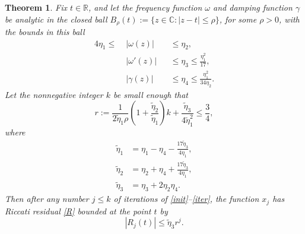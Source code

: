 \documentclass[10pt]{article}
\newcommand{\be}{\begin{equation}}
\newcommand{\ee}{\end{equation}}
\newcommand{\C}{\mathbb{C}}
\newcommand{\R}{\mathbb{R}}
\newcommand{\bigO}{{\mathcal O}}
\newtheorem{thm}{Theorem}
\newcommand{\om}{\omega}
\newcommand{\g}{\gamma}
\newcommand{\te}{\tilde\eta}
\begin{document}


\begin{thm}\label{TR}   
  Fix $t\in\R$, and let the frequency function $\om$ and damping function $\g$ be analytic
  in the closed ball $B_\rho(t) := \{z\in\C : |z-t| \le \rho\}$,
  for some $\rho>0$, with the bounds in this ball
    \begin{alignat}{4}
        \eta_1 \leq \; &|\om(z)| && \leq \eta_2,          \label{ommag} \\
         &|\om'(z)| &&\leq \eta_3 \leq \frac{\eta_1^2}{17}, \label{omder} \\
         &|\g(z)| &&\leq \eta_4 \leq \frac{\eta_1^2}{34\eta_2}. \label{gammaupper}
  \end{alignat}
  Let the nonnegative integer $k$ be small enough that
  \be
    r := \frac{1}{2\te_1 \rho} \left(1 + \frac{\te_2}{\te_1}\right) k + \frac{\te_3}{4\te_1^2} \leq \frac{3}{4},
  \label{r}
  \ee
  where
    \begin{align}
    \te_1 &= \eta_1 - \eta_4 - \frac{17 \te_3}{4 \eta_1},  \label{eta1} \\ 
    \te_2 &= \eta_2 + \eta_4 + \frac{17 \te_3}{4 \eta_1},   \label{eta2} \\
    \te_3 &= \eta_3 + 2\eta_2\eta_4. \label{eta3}
    \end{align}
  Then after any number $j\le k$ of iterations of \cref{init}--\cref{iter},
  the function $x_j$ has Riccati residual \cref{R} bounded at the point $t$ by
  \be
  |R_j(t)| \le \te_3 r^j. \label{Rjbnd}
  \ee
\end{thm}  %
\end{document}
